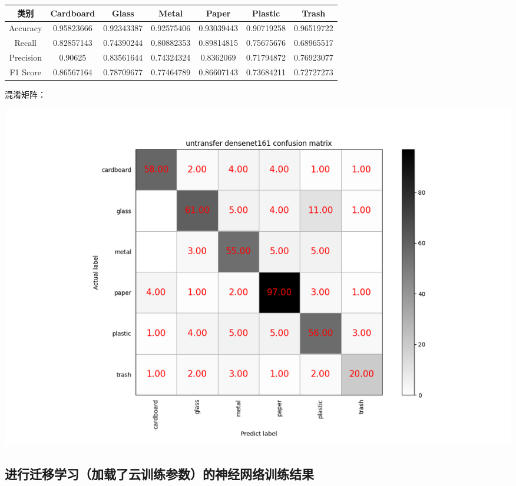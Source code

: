 \documentclass[UTF8]{ctexart}
\begin{document}
\begin{tabular}{|c|c|c|c|c|c|c|}
\hline 
类别 & Cardboard & Glass & Metal & Paper & Plastic & Trash \\ 
\hline 
Accuracy &0.95823666 &0.92343387& 0.92575406& 0.93039443 &0.90719258& 0.96519722\\
 \hline 
Recall &0.82857143 &0.74390244& 0.80882353 &0.89814815& 0.75675676 &0.68965517\\ 
\hline 
Precision &0.90625   & 0.83561644& 0.74324324& 0.8362069 & 0.71794872& 0.76923077\\ 
\hline 
F1 Score &0.86567164& 0.78709677& 0.77464789& 0.86607143 &0.73684211& 0.72727273\\ 
\hline 
\end{tabular}

混淆矩阵：

\includegraphics[scale=0.5]{cm/undense161.png} 

\subsection{进行迁移学习（加载了云训练参数）的神经网络训练结果}
\end{document}
